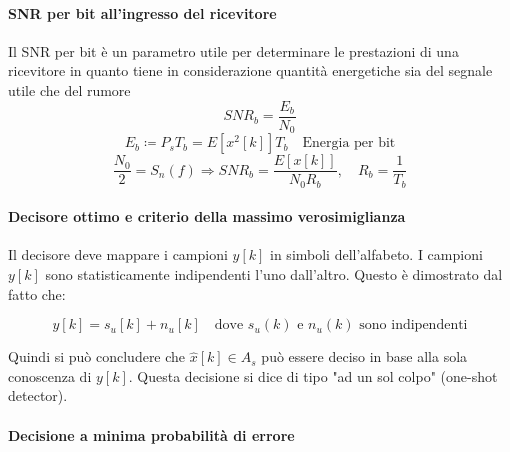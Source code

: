 \paragraph{SNR per bit all'ingresso del ricevitore}

Il SNR per bit è un parametro utile per determinare le prestazioni di una ricevitore in quanto tiene in considerazione quantità energetiche sia del segnale utile che del rumore
\[
SNR_b = \frac{E_b}{N_0} 
\]
\[
E_b \coloneqq P_s T_b = E\left[x^2[k]\right]T_b \quad \text{Energia per bit} \]
\[
\frac{N_0}{2} = S_n(f) 
\Rightarrow SNR_b = \frac{E\left[ x[k]\right]}{N_0 R_b}, \quad R_b = \frac{1}{T_b}
\]

\paragraph{Decisore ottimo e criterio della massimo verosimiglianza}

Il decisore deve mappare i campioni $y[k]$ in simboli dell'alfabeto. I campioni $y[k]$ sono statisticamente indipendenti l'uno dall'altro. Questo è dimostrato dal fatto che:

\[
y[k] = s_u[k] + n_u[k] 
\quad
\text{dove } s_u(k) \text{ e } n_u(k) \text{ sono indipendenti}
\]


\begin{center}
\end{center}

Quindi si può concludere che $\hat{x}[k] \in A_s $ può essere deciso in base alla sola conoscenza di $y[k]$. Questa decisione si dice di tipo "ad un sol colpo" (one-shot detector).

\paragraph{Decisione a minima probabilità di errore}

